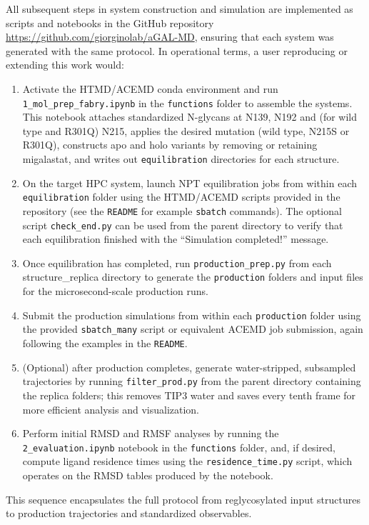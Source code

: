 \documentclass{article}
\begin{document}
All subsequent steps in system construction and simulation are implemented as scripts and notebooks in the GitHub repository \url{https://github.com/giorginolab/aGAL-MD}, ensuring that each system was generated with the same protocol.
In operational terms, a user reproducing or extending this work would:
\begin{enumerate}
    \item Activate the HTMD/ACEMD conda environment and run \verb+1_mol_prep_fabry.ipynb+ in the \texttt{functions} folder to assemble the systems.  
    This notebook attaches standardized N-glycans at N139, N192 and (for wild type and R301Q) N215, applies the desired mutation (wild type, N215S or R301Q), constructs apo and holo variants by removing or retaining migalastat, and writes out \texttt{equilibration} directories for each structure.
    \item On the target HPC system, launch NPT equilibration jobs from within each \texttt{equilibration} folder using the HTMD/ACEMD scripts provided in the repository (see the \verb+README+ for example \verb+sbatch+ commands).  
    The optional script \verb+check_end.py+ can be used from the parent directory to verify that each equilibration finished with the ``Simulation completed!'' message.
    \item Once equilibration has completed, run \verb+production_prep.py+ from each structure\_replica directory to generate the \texttt{production} folders and input files for the microsecond-scale production runs.
    \item Submit the production simulations from within each \texttt{production} folder using the provided \verb+sbatch_many+ script or equivalent ACEMD job submission, again following the examples in the \verb+README+.
    \item (Optional) after production completes, generate water-stripped, subsampled trajectories by running \verb+filter_prod.py+ from the parent directory containing the replica folders; this removes TIP3 water and saves every tenth frame for more efficient analysis and visualization.
    \item Perform initial RMSD and RMSF analyses by running the \verb+2_evaluation.ipynb+ notebook in the \texttt{functions} folder, and, if desired, compute ligand residence times using the \verb+residence_time.py+ script, which operates on the RMSD tables produced by the notebook.
\end{enumerate}

This sequence encapsulates the full protocol from reglycosylated input structures to production trajectories and standardized observables.
\end{document}
